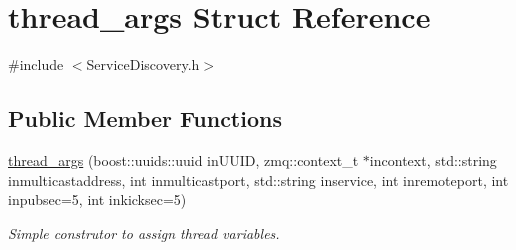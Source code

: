 \hypertarget{structthread__args}{\section{thread\-\_\-args Struct Reference}
\label{structthread__args}
}


{\ttfamily \#include $<$Service\-Discovery.\-h$>$}

\subsection*{Public Member Functions}
\begin{DoxyCompactItemize}
\item 
\hypertarget{structthread__args_a6b3383444ec19a7bd2969229e1b87d2f}{\hyperlink{structthread__args_a6b3383444ec19a7bd2969229e1b87d2f}{thread\-\_\-args} (boost\-::uuids\-::uuid in\-U\-U\-I\-D, zmq\-::context\-\_\-t $\ast$incontext, std\-::string inmulticastaddress, int inmulticastport, std\-::string inservice, int inremoteport, int inpubsec=5, int inkicksec=5)}\label{structthread__args_a6b3383444ec19a7bd2969229e1b87d2f}

\begin{DoxyCompactList}\small\item\em Simple construtor to assign thread variables. \end{DoxyCompactList}\end{DoxyCompactItemize}
